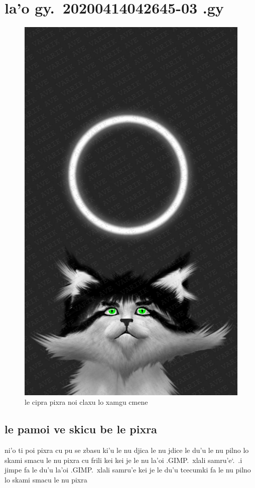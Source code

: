 \documentclass{report}
\newcommand\sds{\spacefactor\sfcode`.\ \space}
\begin{document}
\chapter{la'o gy.\ 20200414042645-03 .gy}
\begin{figure}[ht]
	\centering
	\includegraphics[keepaspectratio, width=\textwidth, height=0.75\textheight]{20200414042645-03/20200414042645-03.jpg}
	\caption[center]{le cipra pixra noi claxu lo xamgu cmene}
\end{figure}
\section{le pamoi ve skicu be le pixra}
ni'o ti poi pixra cu pu se zbasu ki'u le nu djica le nu jdice le du'u le nu pilno lo skami smacu le nu pixra cu frili kei kei je le nu la'oi .GIMP.\ xlali samru'e\sds  .i jimpe fa le du'u la'oi .GIMP.\ xlali samru'e kei je le du'u tcecumki fa le nu pilno lo skami smacu le nu pixra
\end{document}

